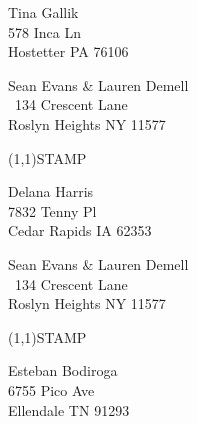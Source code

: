 \documentclass[12pt]{article}
\begin{document}
\begin{center} \begin{Huge} \vspace*{\fill}
Tina Gallik\\
578 Inca Ln\\
Hostetter PA 76106\\
\vspace{\fill} \end{Huge} \end{center}

\clearpage

\begin{minipage}{.5\linewidth} \noindent
Sean Evans \& Lauren Demell\\\ 
134 Crescent Lane\\ 
Roslyn Heights NY 11577
\end{minipage}
\begin{minipage}{.5\linewidth \hspace{-.2in} \vspace{-.3in}}
\begin{flushright}
\framebox(1,1){STAMP}
\end{flushright}
\end{minipage}

\begin{center} \begin{Huge} \vspace*{\fill}
Delana Harris\\
7832 Tenny Pl\\
Cedar Rapids IA 62353\\
\vspace{\fill} \end{Huge} \end{center}

\clearpage

\begin{minipage}{.5\linewidth} \noindent
Sean Evans \& Lauren Demell\\\ 
134 Crescent Lane\\ 
Roslyn Heights NY 11577
\end{minipage}
\begin{minipage}{.5\linewidth \hspace{-.2in} \vspace{-.3in}}
\begin{flushright}
\framebox(1,1){STAMP}
\end{flushright}
\end{minipage}

\begin{center} \begin{Huge} \vspace*{\fill}
Esteban Bodiroga\\
6755 Pico Ave\\
Ellendale TN 91293\\
\vspace{\fill} \end{Huge} \end{center}
\end{document}
